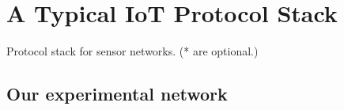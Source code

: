\section{A Typical IoT Protocol Stack}

\begin{table}[!h]
	\centering
	
	\caption{Protocol stack for sensor networks. (* are optional.)\label{Protocols}}
\end{table}



\subsection{Our experimental network}

